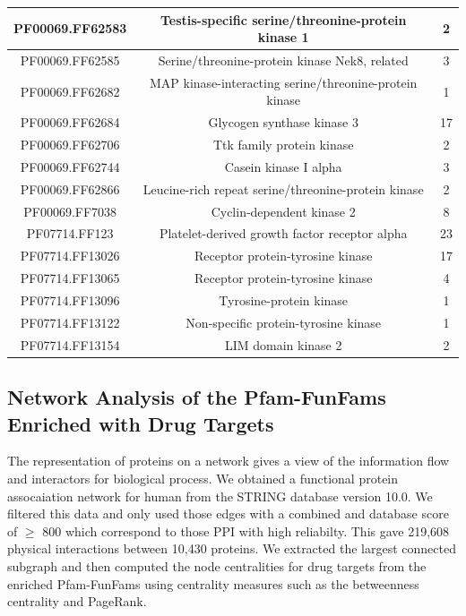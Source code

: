 \documentclass[a4paper, 11pt]{article}
\begin{document}
\begin{table}[H]
\begin{tabular}{|c|c|c|}
PF00069.FF62583 & Testis-specific serine/threonine-protein kinase 1              & 2            \\ \hline
PF00069.FF62585 & Serine/threonine-protein kinase Nek8, related                  & 3            \\ \hline
PF00069.FF62682 & MAP kinase-interacting serine/threonine-protein kinase         & 1            \\ \hline
PF00069.FF62684 & Glycogen synthase kinase 3                                     & 17           \\ \hline
PF00069.FF62706 & Ttk family protein kinase                                      & 2            \\ \hline
PF00069.FF62744 & Casein kinase I alpha                                          & 3            \\ \hline
PF00069.FF62866 & Leucine-rich repeat serine/threonine-protein kinase            & 2            \\ \hline
PF00069.FF7038  & Cyclin-dependent kinase 2                                      & 8            \\ \hline
PF07714.FF123   & Platelet-derived growth factor receptor alpha                  & 23           \\ \hline
PF07714.FF13026 & Receptor protein-tyrosine kinase                               & 17           \\ \hline
PF07714.FF13065 & Receptor protein-tyrosine kinase                               & 4            \\ \hline
PF07714.FF13096 & Tyrosine-protein kinase                                        & 1            \\ \hline
PF07714.FF13122 & Non-specific protein-tyrosine kinase                           & 1            \\ \hline
PF07714.FF13154 & LIM domain kinase 2                                            & 2            \\ \hline
\end{tabular}
\end{table}


\subsection*{Network Analysis of the Pfam-FunFams Enriched with Drug Targets}
The representation of proteins on a network gives a view of the information flow and interactors for biological process. We obtained a functional protein assocaiation network for human from the STRING database version 10.0. We filtered this data and only used those edges with a combined and database score of $\geq$ 800 which correspond to those PPI with high reliabilty. This gave 219,608 physical interactions between 10,430 proteins. We extracted the largest connected subgraph and then computed the node centralities for drug targets from the enriched Pfam-FunFams using centrality measures such as the betweenness centrality and PageRank. 
\end{document}
